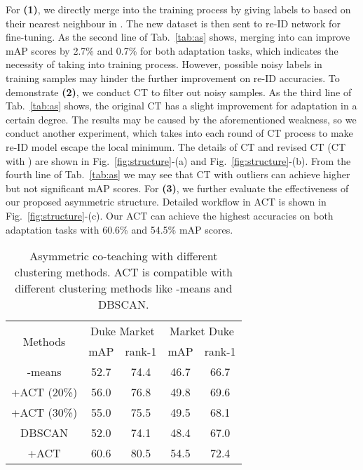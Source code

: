 \documentclass[letterpaper]{article} \usepackage{aaai20}  \usepackage{times}  \usepackage{helvet} \usepackage{courier}  \usepackage[hyphens]{url}  \usepackage{graphicx} \urlstyle{rm} \def\UrlFont{\rm}  \usepackage{graphicx}  \frenchspacing  \setlength{\pdfpagewidth}{8.5in}  \setlength{\pdfpageheight}{11in}  \usepackage{color}
\begin{document}
For \textbf{(1)}, we directly merge  into the training process by giving labels to  based on their nearest neighbour in . The new dataset is then sent to re-ID network for fine-tuning. As the second line of Tab.~\ref{tab:as} shows, merging  into  can improve mAP scores by 2.7\% and 0.7\% for both adaptation tasks, which indicates the necessity of taking  into training process. However, possible noisy labels in training samples may hinder the further improvement on re-ID accuracies. To demonstrate \textbf{(2)}, we conduct CT to filter out noisy samples. As the third line of Tab.~\ref{tab:as} shows, the original CT has a slight improvement for adaptation in a certain degree. The results may be caused by the aforementioned weakness, so we conduct another experiment, which takes  into each round of CT process to make re-ID model escape the local minimum. The details of CT and revised CT (CT with ) are shown in Fig.~\ref{fig:structure}-(a) and Fig.~\ref{fig:structure}-(b). From the fourth line of Tab.~\ref{tab:as} we may see that CT with outliers can achieve higher but not significant mAP scores. For \textbf{(3)}, we further evaluate the effectiveness of our proposed asymmetric structure. Detailed workflow in ACT is shown in Fig.~\ref{fig:structure}-(c). Our ACT can achieve the highest accuracies on both adaptation tasks with 60.6\% and 54.5\% mAP scores.


\begin{table}[!t]
    \centering
    \caption{Asymmetric co-teaching with different clustering methods. ACT is compatible with different clustering methods like -means and DBSCAN.}
    \label{tab:clusterAS}
    \begin{tabular}{c|cc|cc} 
        \hline
        \multirow{2}{*}{Methods} & \multicolumn{2}{c}{Duke  Market} \vline & \multicolumn{2}{c}{Market  Duke}\\
        \cline{2-5}
          & mAP & rank-1 & mAP & rank-1\\
        \hline
        -means & 52.7 & 74.4 & 46.7 & 66.7 \\
        +ACT (20\%) & 56.0 & 76.8 & 49.8 & 69.6 \\
        +ACT (30\%) & 55.0 & 75.5 & 49.5 & 68.1 \\
        \hline
        DBSCAN & 52.0 & 74.1 & 48.4 & 67.0 \\
        +ACT  & 60.6 & 80.5 & 54.5 & 72.4\\
        \hline
      \end{tabular}
\end{table}
\end{document}
